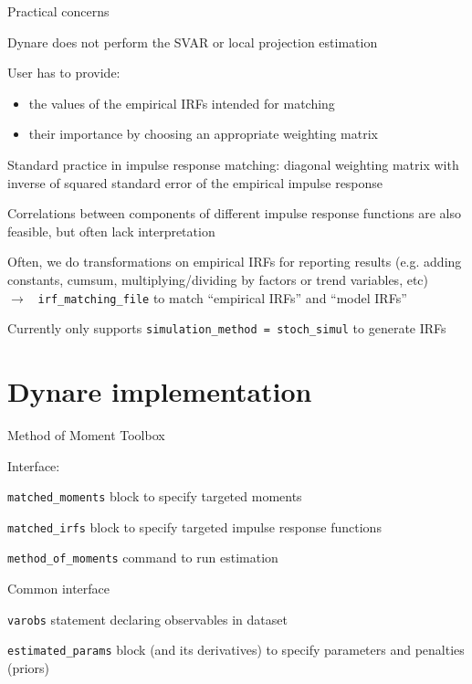 \begin{frame}{Practical concerns}
  \begin{witemize}
    \item Dynare does not perform the SVAR or local projection estimation
    \item User has to provide:
    \begin{itemize}
      \item the values of the empirical IRFs intended for matching
      \item their importance by choosing an appropriate weighting matrix
    \end{itemize}
    \item Standard practice in impulse response matching: diagonal weighting matrix with inverse of squared standard error of the empirical impulse response
    \item Correlations between components of different impulse response functions are also feasible, but often lack interpretation
    \item Often, we do transformations on empirical IRFs for reporting results (e.g. adding
    constants, cumsum, multiplying/dividing by factors or trend variables, etc)\\
    $\rightarrow$ \texttt{
      irf\_matching\_file} to match ``empirical IRFs'' and ``model IRFs''
    \item Currently only supports \texttt{simulation\_method = stoch\_simul} to generate IRFs
  \end{witemize}
\end{frame}

\section{Dynare implementation}

\begin{frame}{Method of Moment Toolbox}

  \begin{witemize}
    \item Interface:
          \begin{witemize}
            \item \texttt{matched\_moments} block to specify targeted moments
            \item \texttt{matched\_irfs} block to specify targeted impulse response functions
            \item \texttt{method\_of\_moments} command to run estimation
          \end{witemize}
    \item Common interface
          \begin{witemize}
            \item \texttt{varobs} statement declaring observables in dataset
            \item \texttt{estimated\_params} block (and its derivatives) to specify parameters and penalties (priors)
          \end{witemize}
  \end{witemize}

\end{frame}


